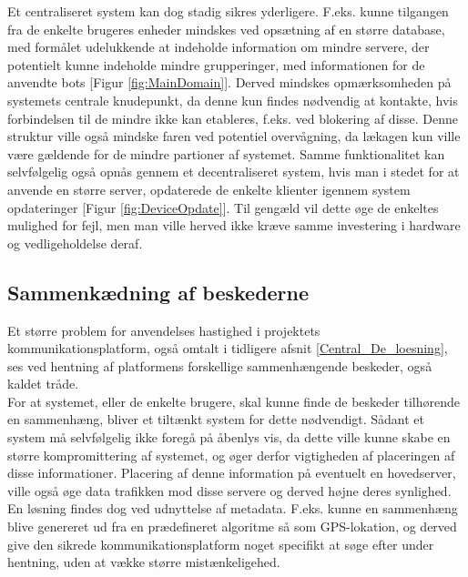 Et centraliseret system kan dog stadig sikres yderligere. F.eks. kunne tilgangen fra de enkelte brugeres enheder mindskes ved opsætning af en større database, med formålet udelukkende at indeholde information om mindre servere, der potentielt kunne indeholde mindre grupperinger, med informationen for de anvendte bots [Figur \ref{fig:MainDomain}]. Derved mindskes opmærksomheden på systemets centrale knudepunkt, da denne kun findes nødvendig at kontakte, hvis forbindelsen til de mindre ikke kan etableres, f.eks. ved blokering af disse. Denne struktur ville også mindske faren ved potentiel overvågning, da lækagen kun ville være gældende for de mindre partioner af systemet.
Samme funktionalitet kan selvfølgelig også opnås gennem et decentraliseret system, hvis man i stedet for at anvende en større server, opdaterede de enkelte klienter igennem system opdateringer [Figur \ref{fig:DeviceOpdate}]. Til gengæld vil dette øge de enkeltes mulighed for fejl, men man ville herved ikke kræve samme investering i hardware og vedligeholdelse deraf.

\subsection{Sammenkædning af beskederne}
Et større problem for anvendelses hastighed i projektets kommunikationsplatform, også omtalt i tidligere afsnit \ref{Central_De_loesning}, ses ved hentning af platformens forskellige sammenhængende beskeder, også kaldet tråde.\\
For at systemet, eller de enkelte brugere, skal kunne finde de beskeder tilhørende en sammenhæng, bliver et tiltænkt system for dette nødvendigt. Sådant et system må selvfølgelig ikke foregå på åbenlys vis, da dette ville kunne skabe en større kompromittering af systemet, og øger derfor vigtigheden af placeringen af disse informationer. Placering af denne information på eventuelt en hovedserver, ville også øge data trafikken mod disse servere og derved højne deres synlighed. En løsning findes dog ved udnyttelse af metadata. F.eks. kunne en sammenhæng blive genereret ud fra en prædefineret algoritme så som GPS-lokation, og derved give den sikrede kommunikationsplatform noget specifikt at søge efter under hentning, uden at vække større mistænkeligehed. 


